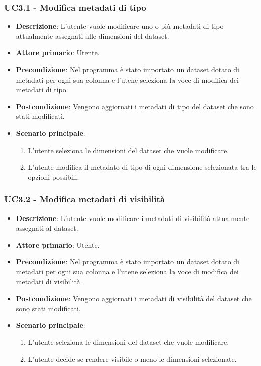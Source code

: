 \newpage
\subsubsection{UC3.1 - Modifica metadati di tipo}
\label{subsubsec:uc3.1}

\begin{itemize}
    \item \textbf{Descrizione}: L’utente vuole modificare uno o più metadati di tipo attualmente assegnati alle dimensioni del dataset.
	
    \item \textbf{Attore primario}: Utente.
    
    \item \textbf{Precondizione}:   Nel programma è stato importato un dataset dotato di metadati per 
                                    ogni sua colonna e l'utene seleziona la voce di modifica dei metadati di tipo.
    \item \textbf{Postcondizione}:  Vengono aggiornati i metadati di tipo del dataset che sono stati modificati.

	\item \textbf{Scenario principale}:
		\begin{enumerate}
            \item L'utente seleziona le dimensioni del dataset che vuole modificare.
            \item L'utente modifica il metadato di tipo di ogni dimensione selezionata tra le opzioni possibili.
        \end{enumerate}
\end{itemize}


\subsubsection{UC3.2 - Modifica metadati di visibilità}
\label{subsubsec:uc3.2}

\begin{itemize}
    \item \textbf{Descrizione}: L’utente vuole modificare i metadati di visibilità attualmente assegnati al dataset.
	
    \item \textbf{Attore primario}: Utente.
    
    \item \textbf{Precondizione}:   Nel programma è stato importato un dataset dotato di metadati per 
                                    ogni sua colonna e l'utene seleziona la voce di modifica dei metadati di visibilità.
    \item \textbf{Postcondizione}:  Vengono aggiornati i metadati di visibilità del dataset che sono stati modificati.

	\item \textbf{Scenario principale}:
		\begin{enumerate}
            \item L'utente seleziona le dimensioni del dataset che vuole modificare.
            \item L'utente decide se rendere visibile o meno le dimensioni selezionate.
        \end{enumerate}
\end{itemize}

